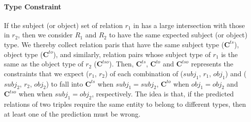 \paragraph{Type Constraint}
If the subject (or object) set of relation $r_1$ in \KB has a large intersection with those in $r_2$, then we consider $R_1$ and $R_2$ to have the same expected subject (or object) type. 
We thereby collect relation paris that have the same subject type ($\bm{C}^{ts}$), object type ($\bm{C}^{to}$), and similarly, relation pairs whose subject type of $r_1$ is the same as the object type of $r_2$ ($\bm{C}^{tso}$).
Then, $\bm{C}^{ts}$, $\bm{C}^{to}$ and $\bm{C}^{tso}$ represents the constraints that we expect ($r_1$, $r_2$) of each combination of ($subj_1$, $r_1$, $obj_1$) and ($subj_2$, $r_2$, $obj_2$) to fall into $\bm{C}^{ts}$ when $subj_1=subj_2$, $\bm{C}^{to}$ when $obj_1=obj_2$ and $\bm{C}^{tso}$ when when $subj_1=obj_2$, respectively.
The idea is that, if the predicted relations of two triples require the same entity to belong to different types, then at least one of the prediction must be wrong.


